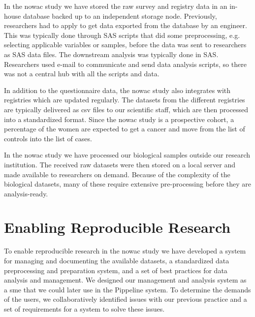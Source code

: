 In the \gls{nowac} study we have stored the raw survey and registry data in an
in-house database backed up to an independent storage node. Previously,
researchers had to apply to get data exported from the database by an engineer.
This was typically done through SAS scripts that did some preprocessing, e.g.
selecting applicable variables or samples, before the data was sent to
researchers as SAS data files. The downstream analysis was typically done in
SAS. Researchers used e-mail to communicate and send data analysis scripts, so
there was not a central hub with all the scripts and data. 

In addition to the questionnaire data, the \gls{nowac} study also integrates
with registries which are updated regularly. The datasets from the different
registries are typically delivered as \gls{csv} files to our scientific staff,
which are then processed into a standardized format. Since the \gls{nowac} study
is a prospective cohort, a percentage of the women are expected to get a cancer
and move from the list of controls into the list of cases. 

In the \gls{nowac} study we have processed our biological samples outside our
research institution. The received raw datasets were then stored on a
local server and made available to researchers on demand. Because of the
complexity of the biological datasets, many of these require extensive
pre-processing before they are analysis-ready. 


\section{Enabling Reproducible Research} 
To enable reproducible research in the \gls{nowac} study we have developed a
system for managing and documenting the available datasets, a standardized data
preprocessing and preparation system, and a set of best practices for data
analysis and management. We designed our management and analysis system as a
\gls{sme} that we could later use in the Pippeline system. To determine the
demands of the users, we collaboratively identified issues with our previous
practice and a set of requirements for a system to solve these issues.

